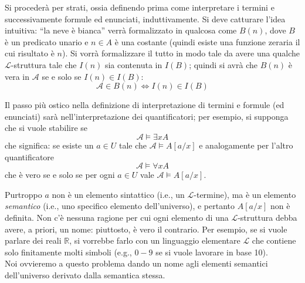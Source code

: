 Si procederà per strati, ossia definendo prima come interpretare 
i termini e successivamente formule ed enunciati, induttivamente. 
Si deve catturare l'idea intuitiva: ``la neve è bianca'' verrà 
formalizzato in qualcosa come $B(n)$, dove $B$ è un predicato 
unario e $n \in A$ è una costante (quindi esiste una funzione zeraria 
il cui risultato è $n$). Si vorrà formalizzare il tutto in modo tale da avere una 
qualche $\mathscr{L}$-struttura tale che $I(n)$ sia contenuta in $I(B)$; quindi si avrà che 
$B(n)$ è vera in $\mathscr{A}$ se e solo se $I(n) \in I(B)$: 
$$
\mathscr{A} \in B(n) \iff I(n) \in I(B)
$$

Il passo più ostico nella definizione di interpretazione di termini 
e formule (ed enunciati) sarà nell'interpretazione dei quantificatori; 
per esempio, si supponga che si vuole stabilire se 
$$
\mathscr{A} \models \exists x A
$$
che significa: se esiste un $a \in U$ tale che $\mathscr{A} \models A[a/x]$
e  analogamente per l'altro quantificatore 
$$
\mathscr{A} \models \forall x A
$$
che è vero se e solo se per ogni $a \in U$ vale $\mathscr{A} \models A[a/x]$. 

Purtroppo $a$ non è un elemento sintattico (i.e., un $\mathscr{L}$-termine), ma è un elemento \textit{semantico} (i.e., uno specifico elemento dell'universo), e pertanto $A[a/x]$ non è definita.
Non c'è nessuna ragione per cui ogni elemento di una $\mathscr{L}$-struttura debba avere, a priori, un nome: piuttosto, è vero il contrario. Per esempio, se si vuole parlare dei reali $\mathbb{R}$, si vorrebbe farlo con un linguaggio elementare $\mathscr{L}$ che contiene solo finitamente molti simboli (e.g., $0-9$ se si vuole lavorare in base 10). \\
Noi ovvieremo a questo problema dando un nome agli elementi semantici dell'universo derivato dalla semantica stessa.

